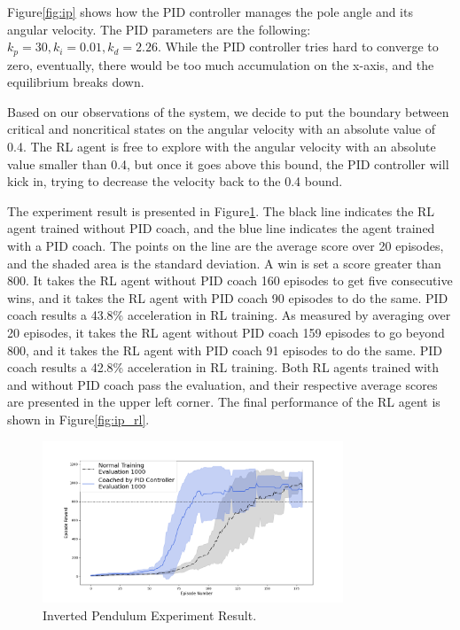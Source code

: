 Figure\ref{fig:ip} shows how the PID controller manages the pole angle and its angular velocity. The PID parameters are the following: $k_p=30,k_i=0.01,k_d=2.26$. While the PID controller tries hard to converge to zero, eventually, there would be too much accumulation on the x-axis, and the equilibrium breaks down.

Based on our observations of the system, we decide to put the boundary between critical and noncritical states on the angular velocity with an absolute value of 0.4. The RL agent is free to explore with the angular velocity with an absolute value smaller than 0.4, but once it goes above this bound, the PID controller will kick in, trying to decrease the velocity back to the 0.4 bound.

The experiment result is presented in Figure\ref{fig:ip_result}. The black line indicates the RL agent trained without PID coach, and the blue line indicates the agent trained with a PID coach. The points on the line are the average score over 20 episodes, and the shaded area is the standard deviation. A win is set a score greater than 800. It takes the RL agent without PID coach 160 episodes to get five consecutive wins, and it takes the RL agent with PID coach 90 episodes to do the same. PID coach results a 43.8\% acceleration in RL training. As measured by averaging over 20 episodes, it takes the RL agent without PID coach 159 episodes to go beyond 800, and it takes the RL agent with PID coach 91 episodes to do the same. PID coach results a 42.8\% acceleration in RL training. Both RL agents trained with and without PID coach pass the evaluation, and their respective average scores are presented in the upper left corner. The final performance of the RL agent is shown in Figure\ref{fig:ip_rl}.
\begin{figure}[H]
\centering
\includegraphics[width=0.8\textwidth]{ip.png}
\caption{Inverted Pendulum Experiment Result. }
\label{fig:ip_result}

\end{figure}


